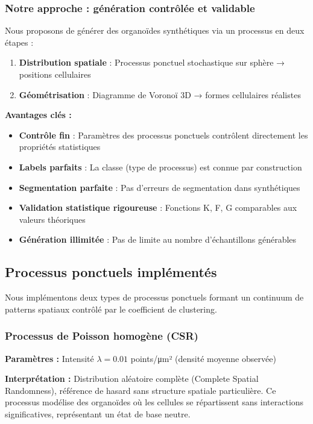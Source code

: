 \subsubsection{Notre approche : génération contrôlée et validable}

Nous proposons de générer des organoïdes synthétiques via un processus en deux étapes :
\begin{enumerate}
    \item \textbf{Distribution spatiale} : Processus ponctuel stochastique sur sphère → positions cellulaires
    \item \textbf{Géométrisation} : Diagramme de Voronoï 3D → formes cellulaires réalistes
\end{enumerate}

\textbf{Avantages clés :}
\begin{itemize}
    \item \textbf{Contrôle fin} : Paramètres des processus ponctuels contrôlent directement les propriétés statistiques
    \item \textbf{Labels parfaits} : La classe (type de processus) est connue par construction
    \item \textbf{Segmentation parfaite} : Pas d'erreurs de segmentation dans synthétiques
    \item \textbf{Validation statistique rigoureuse} : Fonctions K, F, G comparables aux valeurs théoriques
    \item \textbf{Génération illimitée} : Pas de limite au nombre d'échantillons générables
\end{itemize}

\subsection{Processus ponctuels implémentés}

Nous implémentons deux types de processus ponctuels formant un continuum de patterns spatiaux contrôlé par le coefficient de clustering.

\subsubsection{Processus de Poisson homogène (CSR)}

\textbf{Paramètres :} Intensité $\lambda = 0.01$ points/μm² (densité moyenne observée)

\textbf{Interprétation :} Distribution aléatoire complète (Complete Spatial Randomness), référence de hasard sans structure spatiale particulière. Ce processus modélise des organoïdes où les cellules se répartissent sans interactions significatives, représentant un état de base neutre.

